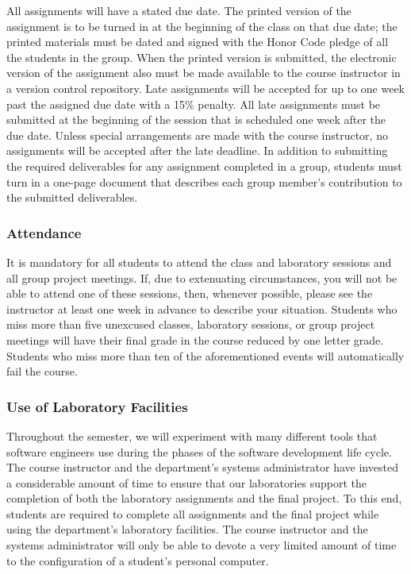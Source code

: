 All assignments will have a stated due date. The printed version of the assignment is to be turned in at the beginning
of the class on that due date; the printed materials must be dated and signed with the Honor Code pledge of all the
students in the group.  When the printed version is submitted, the electronic version of the assignment also must be
made available to the course instructor in a version control repository. Late assignments will be accepted for up to one
week past the assigned due date with a 15\% penalty. All late assignments must be submitted at the beginning of the
session that is scheduled one week after the due date. Unless special arrangements are made with the course instructor,
no assignments will be accepted after the late deadline. In addition to submitting the required deliverables for any
assignment completed in a group, students must turn in a one-page document that describes each group member's
contribution to the submitted deliverables.

\subsubsection*{Attendance}

It is mandatory for all students to attend the class and laboratory sessions and all group project meetings. If, due to
extenuating circumstances, you will not be able to attend one of these sessions, then, whenever possible, please see the
instructor at least one week in advance to describe your situation. Students who miss more than five unexcused classes,
laboratory sessions, or group project meetings will have their final grade in the course reduced by one letter grade.
Students who miss more than ten of the aforementioned events will automatically fail the course.

\subsubsection*{Use of Laboratory Facilities}

Throughout the semester, we will experiment with many different tools that software engineers use during the phases of
the software development life cycle.  The course instructor and the department's systems administrator have invested a
considerable amount of time to ensure that our laboratories support the completion of both the laboratory assignments and the
final project.  To this end, students are required to complete all assignments and the final project while using the
department's laboratory facilities. The course instructor and the systems administrator will only be able to devote a
very limited amount of time to the configuration of a student's personal computer.

